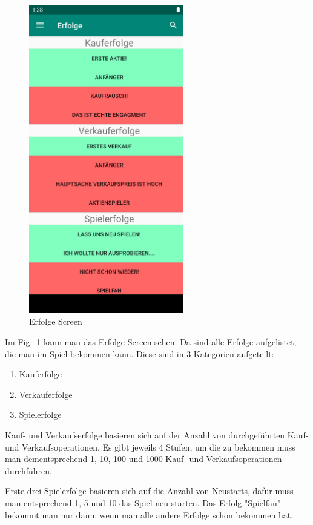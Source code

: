 \documentclass[10pt]{scrartcl}
\begin{document}
\begin{figure}[H]
	\centering
	\includegraphics[width=0.6\textwidth]{Bilder/Applikation/erfolge.png}
	 \caption{Erfolge Screen}
	 \label{erfolge1}
\end{figure}

Im Fig.~\ref{erfolge1} kann man das Erfolge Screen sehen. Da sind alle Erfolge aufgelistet, die man im Spiel bekommen kann. Diese sind in 3 Kategorien aufgeteilt:
 \begin{enumerate}
 	\item Kauferfolge
 	\item Verkauferfolge
 	\item Spielerfolge
 \end{enumerate}
Kauf- und Verkaufserfolge basieren sich auf der Anzahl von durchgeführten Kauf- und Verkaufsoperationen. Es gibt jeweils 4 Stufen, um die zu bekommen muss man dementsprechend 1, 10, 100 und 1000 Kauf- und Verkaufsoperationen durchführen.

Erste drei Spielerfolge basieren sich auf die Anzahl von Neustarts, dafür muss man entsprechend 1, 5 und 10 das Spiel neu starten. Das Erfolg "Spielfan" bekommt man nur dann, wenn man alle andere Erfolge schon bekommen hat.
\end{document}
